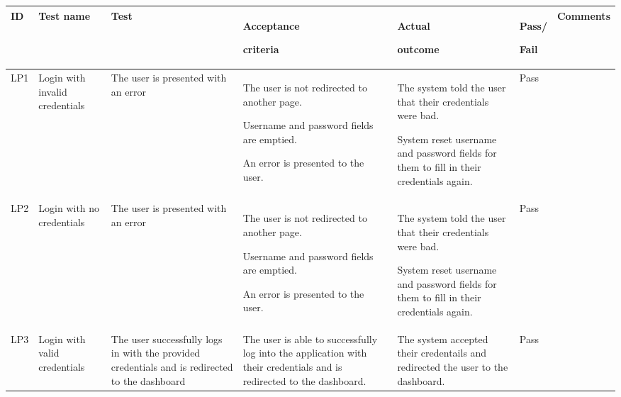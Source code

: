  \begin{longtable}{|p{}|p{}|p{}|p{}|p{}|p{}|p{}|}
  \hline
  ID          &   Test name            & Test                                                                                           & Acceptance \par criteria                                                                                                           & Actual \par outcome                                                                                                                                        & Pass/\par Fail & Comments\\
  \hline\hline                                                                                                                             
  LP1 & Login with invalid credentials & The user is presented with an error                                                            & The user is not redirected to another page. \par Username and password fields are emptied. \par An error is presented to the user. & The system told the user that their credentials were bad. \par System reset username and password fields for them to fill in their credentials again.      & Pass           &         \\
  \hline                                                                                                                                   
  LP2 & Login with no credentials      & The user is presented with an error                                                            & The user is not redirected to another page. \par Username and password fields are emptied. \par An error is presented to the user. & The system told the user that their credentials were bad. \par System reset username and password fields for them to fill in their credentials again.      & Pass           &         \\
  \hline
  LP3 & Login with valid credentials   & The user successfully logs in with the provided credentials and is redirected to the dashboard & The user is able to successfully log into the application with their credentials and is redirected to the dashboard.               & The system accepted their credentails and redirected the user to the dashboard.                                                                            & Pass           &         \\

\end{longtable}
